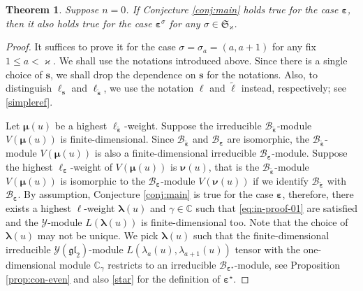 \documentclass[11pt,reqno]{amsart}
\numberwithin{equation}{section}
\newtheorem{thm}{Theorem}[section]
\theoremstyle{definition}
\theoremstyle{remark}
\newcommand{\gl}{\mathfrak{gl}}
\newcommand{\fkS}{\mathfrak{S}}
\newcommand{\bC}{\mathbb{C}}
\newcommand{\tl}{\tilde}
\newcommand{\lle}{\leqslant}
\newcommand{\la}{\lambda}
\newcommand{\bla}{\bm\lambda}
\newcommand{\ka}{\varkappa}
\newcommand{\ve}{\varepsilon}
\newcommand{\s}{{\bm s}}
\begin{document}

\begin{thm}\label{thm:reflection}
Suppose $n=0$. If Conjecture \ref{conj:main} holds true for the case $\bm\ve$, then it also holds true for the case $\bm \ve^\sigma$ for any $\sigma\in\fkS_\ka$.
\end{thm}
\begin{proof}
It suffices to prove it for the case $\sigma=\sigma_a=(a,a+1)$ for any fix $1\lle a<\ka$. We shall use the notations introduced above. Since there is a single choice of $\s$, we shall drop the dependence on $\s$ for the notations. Also, to distinguish $\ell_{\s}$ and $\ell_{\tl\s}$, we use the notation $\ell$ and $\tl \ell$ instead, respectively; see \eqref{simpleref}.

Let $\bm\mu(u)$ be a highest $\ell_{\tl{\bm\ve}}$-weight. Suppose the irreducible $\mathscr B_{\tl{\bm\ve}}$-module  $V(\bm\mu(u))$ is finite-dimensional. Since $\mathscr B_{\tl{\bm\ve}}$ and $\mathscr B_{\bm\ve}$ are isomorphic, the $\mathscr B_{\tl{\bm\ve}}$-module $V(\bm\mu(u))$ is also a finite-dimensional irreducible $\mathscr B_{\bm\ve}$-module. Suppose the highest $\ell_{\bm\ve}$-weight of $V(\bm\mu(u))$ is $\bm\nu(u)$, that is the $\mathscr B_{\tl{\bm\ve}}$-module $V(\bm\mu(u))$ is isomorphic to the $\mathscr B_{\bm\ve}$-module $V(\bm\nu(u))$ if we identify $\mathscr B_{\tl{\bm\ve}}$ with $\mathscr B_{\bm\ve}$. By assumption, Conjecture \ref{conj:main} is true for the case $\bm\ve$, therefore, there exists a highest $\ell$-weight $\bla(u)$ and $\gamma\in\bC$ such that \eqref{eq:in-proof-01} are satisfied and the $\mathscr Y$-module $L(\bla(u))$ is finite-dimensional too. Note that the choice of $\bla(u)$ may not be unique. We pick $\bla(u)$ such that the finite-dimensional irreducible $\mathscr{Y}(\gl_2)$-module $L(\la_a(u),\la_{a+1}(u))$ tensor with the one-dimensional module $\bC_{\gamma}$ restricts to an irreducible $\mathscr B_{\bm\ve^\star}$-module, see Proposition \ref{prop:con-even} and also \eqref{star} for the definition of $\bm\ve^\star$. 


\end{proof}
\end{document}
